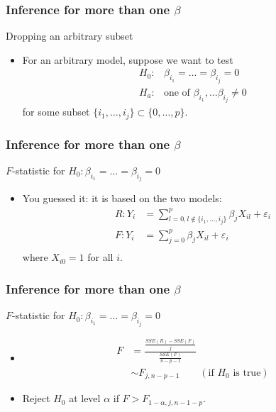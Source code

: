 \documentclass[handout]{beamer}
\begin{document}

   \begin{frame} \frametitle{Inference for more than one $\beta$}

   \begin{block}
   {Dropping an arbitrary subset}
   \begin{itemize}
   \item For an arbitrary model, suppose we want to test
   $$    \begin{aligned}
   H_0:&\beta_{i_1}=\dots=\beta_{i_j}=0 \\
   H_a:& \text{one of $\beta_{i_1}, \dots \beta_{i_j} \neq 0$}
   \end{aligned}
   $$
   for some subset $\{i_1, \dots, i_j\} \subset \{0, \dots, p\}$.

   \end{itemize}
   \end{block}
   \end{frame}


   \begin{frame} \frametitle{Inference for more than one $\beta$}

   \begin{block}
   {$F$-statistic for $H_0:\beta_{i_1}=\dots=\beta_{i_j}=0$}
   \begin{itemize}
   \item You guessed it: it is based on the two models:
   $$
   \begin{aligned}
   R: Y_i &= \sum_{l=0, l \not \in \{i_1, \dots, i_j\}}^p \beta_j X_{il} + \varepsilon_i \\
   F: Y_i &=  \sum_{j=0}^p \beta_j X_{il} + \varepsilon_i \\
   \end{aligned}
   $$
   where $X_{i0}=1$ for all $i$.
   \end{itemize}
   \end{block}
   \end{frame}


   \begin{frame} \frametitle{Inference for more than one $\beta$}

   \begin{block}
   {$F$-statistic for $H_0:\beta_{i_1}=\dots=\beta_{i_j}=0$}
   \begin{itemize}
   \item  $$
   \begin{aligned}
   F &=\frac{\frac{SSE(R) - SSE(F)}{j}}{\frac{SSE(F)}{n-p-1}} \\
   & \sim F_{j, n-p-1}     \qquad    (\text{if $H_0$ is true})
   \end{aligned}
   $$
   \item Reject $H_0$ at level $\alpha$ if $F > F_{1-\alpha, j, n-1-p}$.

   \end{itemize}
   \end{block}
   \end{frame}
\end{document}
